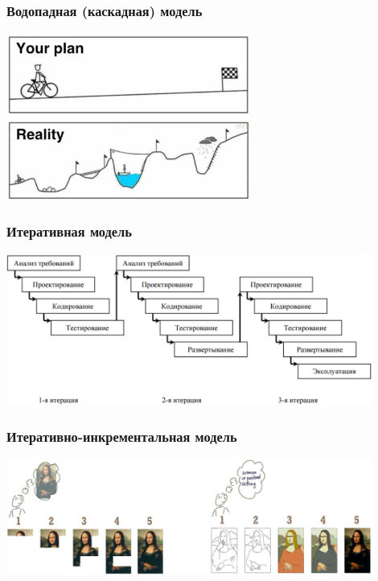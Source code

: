 \documentclass{../../slides-style}
\begin{document}
    \begin{frame}
        \frametitle{Водопадная (каскадная) модель}
        \begin{center}
            \includegraphics[width=0.6\textwidth]{waterfallProblems.png}
        \end{center}
    \end{frame}

    \begin{frame}
        \frametitle{Итеративная модель}
        \begin{center}
            \includegraphics[width=0.9\textwidth]{iterativeModel.png}
        \end{center}
    \end{frame}

    \begin{frame}
        \frametitle{Итеративно-инкрементальная модель}
        \begin{center}
            \includegraphics[width=0.9\textwidth]{iterativeIncrementalModel.png}
        \end{center}
    \end{frame}
\end{document}
